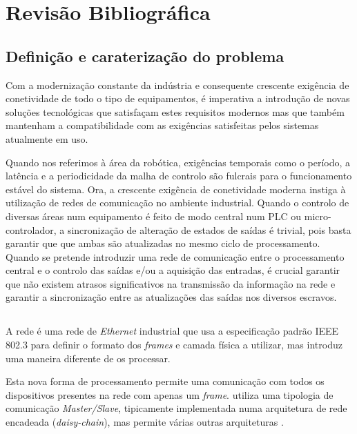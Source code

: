 \chapter{Revisão Bibliográfica} \label{chap:sota}


\section{Definição e caraterização do problema}\label{sec:problem}

Com a modernização constante da indústria e consequente crescente exigência
de conetividade de todo o tipo de equipamentos, é imperativa a introdução
de novas soluções tecnológicas que satisfaçam estes requisitos modernos
mas que também mantenham a compatibilidade com as exigências satisfeitas
pelos sistemas atualmente em uso.

Quando nos referimos à área da robótica, exigências temporais como o
período, a latência e a periodicidade da malha de controlo são fulcrais
para o funcionamento estável do sistema. Ora, a crescente exigência de
conetividade moderna instiga à utilização de redes de comunicação no
ambiente industrial. Quando o controlo de diversas áreas num equipamento
é feito de modo central num PLC ou micro-controlador, a sincronização de
alteração de estados de saídas é trivial, pois basta garantir que que ambas
são atualizadas no mesmo ciclo de processamento. Quando se pretende
introduzir uma rede de comunicação entre o processamento central e o
controlo das saídas e/ou a aquisição das entradas, é crucial garantir
que não existem atrasos significativos na transmissão da informação
na rede e garantir a sincronização entre as atualizações das saídas
nos diversos escravos.


\section{\ecat}\label{sec:ethercat}

A rede \ecat é uma rede de \emph{Ethernet} industrial que usa a
especificação padrão IEEE 802.3 \cite[]{ieee:IEEEStandardEthernet} para
definir o formato dos \emph{frames} e camada física a utilizar, mas
introduz uma maneira diferente de os processar.

Esta nova forma de processamento permite uma comunicação com todos os
dispositivos presentes na rede com apenas um \emph{frame}. \ecat utiliza
uma tipologia de comunicação \emph{Master/Slave}, tipicamente implementada
numa arquitetura de rede encadeada (\emph{daisy-chain}), mas permite várias
outras arquiteturas \cite{}. %

